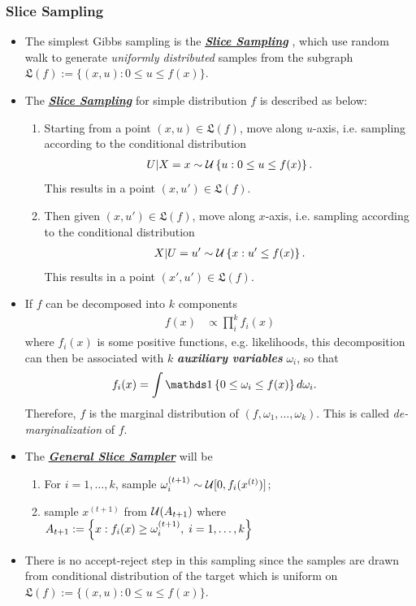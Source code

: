 \documentclass[11pt]{article}
\begin{document}
\subsubsection{Slice Sampling}
\begin{itemize}
\item The simplest Gibbs sampling is the \underline{\textbf{\emph{Slice Sampling}}} \citep{robert1999monte}, which use random walk to generate \emph{uniformly distributed} samples from the subgraph $\mathfrak{L}(f) := \{(x,u): 0 \le u \le f(x)\}.$ 

\item The \underline{\textbf{\emph{Slice Sampling}}} for simple distribution $f$ is described as below:
\begin{enumerate}
\item Starting from a point $(x, u) \in \mathfrak{L}(f)$, move along $u$-axis, i.e. sampling according to the conditional distribution
\begin{align*}
U|X = x \sim {\mathcal U}\left\{u: 0\le u\le f(x)\right\}.
\end{align*} This results in a point $(x, u') \in \mathfrak{L}(f)$.

\item Then given $(x, u') \in \mathfrak{L}(f)$, move along $x$-axis, i.e. sampling according to the conditional distribution
\begin{align*}
X|U = u' \sim {\mathcal U}\left\{x: u'\le f(x)\right\}.
\end{align*} This results in a point $(x', u') \in \mathfrak{L}(f)$.
\end{enumerate}

\item If $f$ can be decomposed into $k$ components
\begin{align*}
f(x) &\propto \prod_{i}^{k}f_{i}(x)
\end{align*} where $f_i(x)$ is some positive functions, e.g. likelihoods, this decomposition can then be associated with $k$ \emph{\textbf{auxiliary variables}} $\omega_i$, so that 
\begin{align*}
f_{i}(x)&= \int \ind{0\le \omega_i \le f(x)} d\omega_i.
\end{align*}  Therefore, $f$ is the marginal distribution of $(f, \omega_1, \ldots, \omega_k)$. This is called \emph{de-marginalization} of $f$.

\item The \underline{\emph{\textbf{General Slice Sampler}}} will be
\begin{enumerate}
\item For $i=1,\ldots,k$, sample $\omega_i^{(t+1)} \sim {\mathcal U}[0, f_{i}(x^{(t)})]$; 
\item sample $x^{(t+1)}$ from ${\mathcal U}(A_{t+1})$ where $A_{t+1} := \left\{x: f_i(x) \ge \omega_i^{(t+1)}, \;i=1,\ldots, k\right\}$
\end{enumerate}

\item There is no accept-reject step in this sampling since the samples are drawn from conditional distribution of the target which is uniform on $\mathfrak{L}(f) := \{(x,u): 0 \le u \le f(x)\}$.
\end{itemize}
\end{document}

